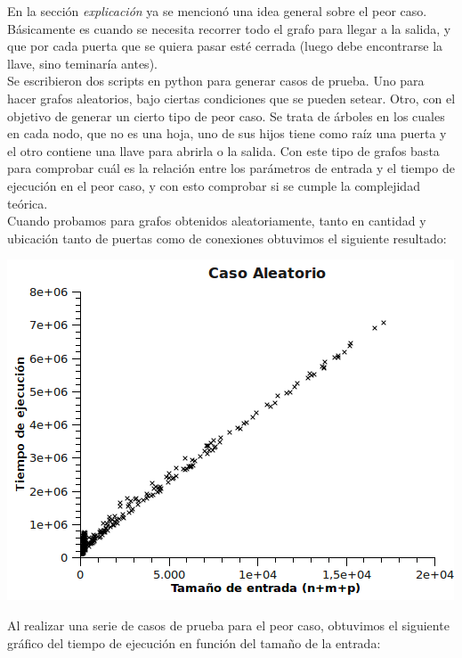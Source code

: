 En la sección \textit{explicación} ya se mencionó una idea general sobre el peor caso. Básicamente es cuando se necesita recorrer todo el grafo para llegar a la salida, y que por cada puerta que se quiera pasar esté cerrada (luego debe encontrarse la llave, sino teminaría antes). \\

Se escribieron dos scripts en python para generar casos de prueba. Uno para hacer grafos aleatorios, bajo ciertas condiciones que se pueden setear. Otro, con el objetivo de generar un cierto tipo de peor caso. Se trata de árboles en los cuales en cada nodo, que no es una hoja, uno de sus hijos tiene como raíz una puerta y el otro contiene una llave para abrirla o la salida. Con este tipo de grafos basta para comprobar cuál es la relación entre los parámetros de entrada y el tiempo de ejecución en el peor caso, y con esto comprobar si se cumple la complejidad teórica. \\

Cuando probamos para grafos obtenidos aleatoriamente, tanto en cantidad y ubicación tanto de puertas como de conexiones obtuvimos el siguiente resultado:

\begin{center}
\includegraphics[scale=0.75]{img/ej3/CasoAleatorio.png} 
\end{center}

Al realizar una serie de casos de prueba para el peor caso, obtuvimos el siguiente gráfico del tiempo de ejecución en función del tamaño de la entrada: \\

